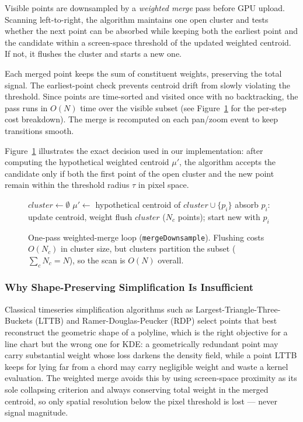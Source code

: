 \documentclass[10pt,conference]{IEEEtran}
\begin{document}
Visible points are downsampled by a \textit{weighted merge} pass before GPU upload. Scanning left-to-right, the algorithm maintains one open cluster and tests whether the next point can be absorbed while keeping both the earliest point and the candidate within a screen-space threshold of the updated weighted centroid. If not, it flushes the cluster and starts a new one.

Each merged point keeps the sum of constituent weights, preserving the total signal. The earliest-point check prevents centroid drift from slowly violating the threshold. Since points are time-sorted and visited once with no backtracking, the pass runs in $O(N)$ time over the visible subset (see Figure~\ref{fig:merge-downsample} for the per-step cost breakdown). The merge is recomputed on each pan/zoom event to keep transitions smooth.

Figure~\ref{fig:merge-downsample} illustrates the exact decision used in our implementation: after computing the hypothetical weighted centroid $\mu'$, the algorithm accepts the candidate only if both the first point of the open cluster and the new point remain within the threshold radius $\tau$ in pixel space.

\begin{figure}[t]
  \centering
  \small
  \begin{algorithmic}[1]
    \STATE $cluster \gets \emptyset$
      \STATE $\mu' \gets$ hypothetical centroid of $cluster \cup \{p_i\}$ 
        \STATE absorb $p_i$: update centroid, weight 
      \ELSE
        \STATE flush $cluster$ ($N_c$ points); start new with $p_i$ 
      \ENDIF
    \ENDFOR
  \end{algorithmic}
  \caption{One-pass weighted-merge loop (\texttt{mergeDownsample}). Flushing costs $O(N_c)$ in cluster size, but clusters partition the subset ($\sum_c N_c = N$), so the scan is $O(N)$ overall.}
  \label{fig:merge-downsample}
\end{figure}

\subsubsection{Why Shape-Preserving Simplification Is Insufficient}

Classical timeseries simplification algorithms such as Largest-Triangle-Three-Buckets (LTTB) \cite{Steinarsson2013} and Ramer-Douglas-Peucker (RDP) \cite{Douglas1973,10589058} select points that best reconstruct the geometric shape of a polyline, which is the right objective for a line chart but the wrong one for KDE: a geometrically redundant point may carry substantial weight whose loss darkens the density field, while a point LTTB keeps for lying far from a chord may carry negligible weight and waste a kernel evaluation. The weighted merge avoids this by using screen-space proximity as its sole collapsing criterion and always conserving total weight in the merged centroid, so only spatial resolution below the pixel threshold is lost --- never signal magnitude.
\end{document}
